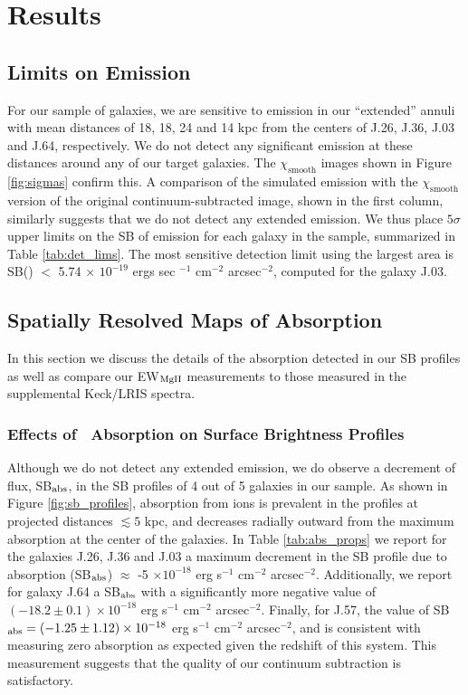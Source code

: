 \documentclass[twocolumn]{aastex62}
\begin{document}
\section{Results}\label{sec:results}

\subsection{Limits on  Emission}
For our sample of galaxies, we are sensitive to emission in our ``extended'' annuli with mean distances of 18, 18, 24 and 14 kpc from the centers of J.26, J.36, J.03 and J.64, respectively.
 We do not detect any significant  emission at these distances around any of our target galaxies. The $\chi_{\text{smooth}}$ images shown in Figure \ref{fig:sigmas} confirm this. A comparison of the simulated emission with the $\chi_{\text{smooth}}$ version of the original continuum-subtracted image, shown in the first column, similarly suggests that we do not detect any extended  emission. We thus place $5\sigma$ upper limits on the SB of  emission for each galaxy in the sample, summarized in Table \ref{tab:det_lims}. The most sensitive detection limit using the largest area is SB() $<$ 5.74 $\times$ $10^{-19}$ ergs sec $^{-1}$ cm$^{-2}$ arcsec$^{-2}$, computed for the galaxy J.03. 

\subsection{Spatially Resolved Maps of  Absorption}
In this section we discuss the details of the absorption detected in our SB profiles as well as compare our EW$_{\rm{MgII}}$ measurements to those measured in the supplemental Keck/LRIS spectra. 

\subsubsection{Effects of \ Absorption on Surface Brightness Profiles} \label{subsubsec:SBprofiles}
Although we do not detect any extended  emission, we do observe a decrement of flux, SB$_{\rm abs}$, in the SB profiles of 4 out of 5 galaxies in our sample. As shown in Figure \ref{fig:sb_profiles}, absorption from  ions is prevalent in the profiles at projected distances $\lesssim5$ kpc, and decreases radially outward from the maximum absorption at the center of the galaxies. In Table \ref{tab:abs_props} we report for the galaxies J.26, J.36 and J.03 a maximum decrement in the SB profile due to absorption (SB$_{\rm abs}$) $\approx$ -5 $\times10^{-18}$ erg s$^{-1}$ cm$^{-2}$ arcsec$^{-2}$. Additionally, we report for galaxy J.64 a SB$_{\rm abs}$ with a significantly more negative value of $(-18.2 \pm 0.1) \times10^{-18}$ erg s$^{-1}$ cm$^{-2}$ arcsec$^{-2}$. Finally, for J.57, %
the value of SB$_{\rm abs} = (-1.25 \pm 1.12) \times10^{-18}$ erg s$^{-1}$ cm$^{-2}$ arcsec$^{-2}$, and is consistent with measuring zero absorption as expected given the redshift of this system. This measurement suggests that the quality of our continuum subtraction is satisfactory.
\end{document}
